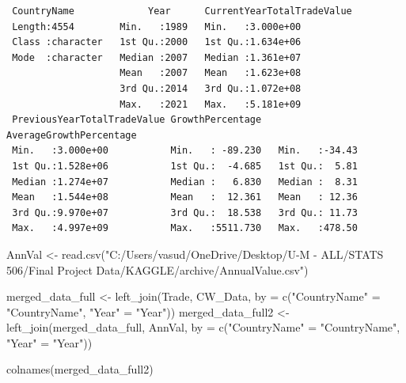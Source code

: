 \documentclass[
  10pt,
]{article}
\newenvironment{Shaded}{\begin{snugshade}}{\end{snugshade}}
\newcommand{\AttributeTok}[1]{\textcolor[rgb]{0.40,0.45,0.13}{#1}}
\newcommand{\FunctionTok}[1]{\textcolor[rgb]{0.28,0.35,0.67}{#1}}
\newcommand{\NormalTok}[1]{\textcolor[rgb]{0.00,0.23,0.31}{#1}}
\newcommand{\OtherTok}[1]{\textcolor[rgb]{0.00,0.23,0.31}{#1}}
\newcommand{\StringTok}[1]{\textcolor[rgb]{0.13,0.47,0.30}{#1}}
\begin{document}
\begin{verbatim}
 CountryName             Year      CurrentYearTotalTradeValue
 Length:4554        Min.   :1989   Min.   :3.000e+00         
 Class :character   1st Qu.:2000   1st Qu.:1.634e+06         
 Mode  :character   Median :2007   Median :1.361e+07         
                    Mean   :2007   Mean   :1.623e+08         
                    3rd Qu.:2014   3rd Qu.:1.072e+08         
                    Max.   :2021   Max.   :5.181e+09         
 PreviousYearTotalTradeValue GrowthPercentage   AverageGrowthPercentage
 Min.   :3.000e+00           Min.   : -89.230   Min.   :-34.43         
 1st Qu.:1.528e+06           1st Qu.:  -4.685   1st Qu.:  5.81         
 Median :1.274e+07           Median :   6.830   Median :  8.31         
 Mean   :1.544e+08           Mean   :  12.361   Mean   : 12.36         
 3rd Qu.:9.970e+07           3rd Qu.:  18.538   3rd Qu.: 11.73         
 Max.   :4.997e+09           Max.   :5511.730   Max.   :478.50         
\end{verbatim}

\begin{Shaded}
\begin{Highlighting}[]
\NormalTok{AnnVal }\OtherTok{\textless{}{-}} \FunctionTok{read.csv}\NormalTok{(}\StringTok{"C:/Users/vasud/OneDrive/Desktop/U{-}M {-} ALL/STATS 506/Final Project Data/KAGGLE/archive/AnnualValue.csv"}\NormalTok{)}
\end{Highlighting}
\end{Shaded}

\begin{Shaded}
\begin{Highlighting}[]
\NormalTok{merged\_data\_full }\OtherTok{\textless{}{-}} \FunctionTok{left\_join}\NormalTok{(Trade, CW\_Data, }\AttributeTok{by =} \FunctionTok{c}\NormalTok{(}\StringTok{"CountryName"} \OtherTok{=} \StringTok{"CountryName"}\NormalTok{, }\StringTok{"Year"} \OtherTok{=} \StringTok{"Year"}\NormalTok{))}
\NormalTok{merged\_data\_full2 }\OtherTok{\textless{}{-}} \FunctionTok{left\_join}\NormalTok{(merged\_data\_full, AnnVal, }\AttributeTok{by =} \FunctionTok{c}\NormalTok{(}\StringTok{"CountryName"} \OtherTok{=} \StringTok{"CountryName"}\NormalTok{, }\StringTok{"Year"} \OtherTok{=} \StringTok{"Year"}\NormalTok{))}
\end{Highlighting}
\end{Shaded}

\begin{Shaded}
\begin{Highlighting}[]
\FunctionTok{colnames}\NormalTok{(merged\_data\_full2)}
\end{Highlighting}
\end{Shaded}
\end{document}
